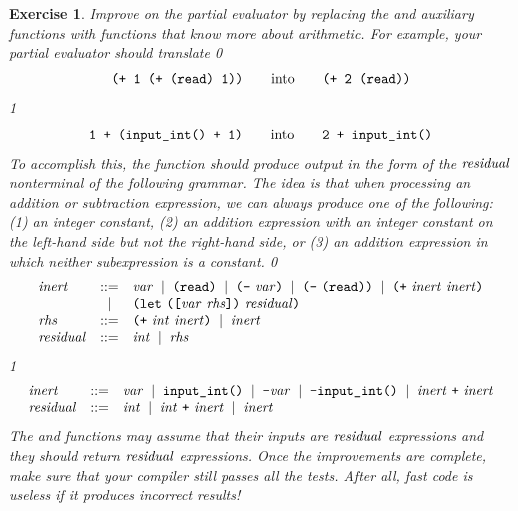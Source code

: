 \documentclass[7x10]{TimesAPriori_MIT}%
\def\racketEd{0}
\def\pythonEd{1}
\def\edition{1}
\newcommand{\pythonColor}[0]{}
\newtheorem{exercise}[theorem]{Exercise}
\numberwithin{theorem}{chapter}
\numberwithin{definition}{chapter}
\numberwithin{equation}{chapter}
\begin{document}
\begin{exercise}
\normalfont\normalsize

Improve on the partial evaluator by replacing the  and
 auxiliary functions with functions that know more about
arithmetic. For example, your partial evaluator should translate
{\if\edition\racketEd
\[
\texttt{(+ 1 (+ (read) 1))} \qquad \text{into} \qquad
\texttt{(+ 2 (read))}
\]
\fi}
{\if\edition\pythonEd\pythonColor
\[
\texttt{1 + (input\_int() + 1)} \qquad \text{into} \qquad
\texttt{2 + input\_int()}
\]
\fi}
%
To accomplish this, the  function should produce output
in the form of the $\mathit{residual}$ nonterminal of the following
grammar. The idea is that when processing an addition or subtraction
expression, we can always produce one of the following: (1) an integer
constant, (2) an addition expression with an integer constant on the
left-hand side but not the right-hand side, or (3) an addition
expression in which neither subexpression is a constant.
%
{\if\edition\racketEd
\[
\begin{array}{lcl}
  \mathit{inert} &::=& \mathit{var}
    \;\mid\; \texttt{(}\texttt{read}\texttt{)}
    \;\mid\; \texttt{(}\texttt{-} ~\mathit{var}\texttt{)}
    \;\mid\; \texttt{(}\texttt{-} ~\texttt{(}\texttt{read}\texttt{)}\texttt{)}
    \;\mid\; \texttt{(}\texttt{+} ~ \mathit{inert} ~ \mathit{inert}\texttt{)}\\
    &\;\mid\;& \texttt{(}\texttt{let}~\texttt{(}\texttt{[}\mathit{var}~\mathit{rhs}\texttt{]}\texttt{)}~ \mathit{residual} \texttt{)} \\  
  \mathit{rhs} &::=& \texttt{(}\texttt{+}~ \mathit{int}~ \mathit{inert}\texttt{)}
    \;\mid\; \mathit{inert} \\
  \mathit{residual} &::=& \mathit{int} \;\mid\; \mathit{rhs} 
\end{array}
\]
\fi}
{\if\edition\pythonEd\pythonColor
\[
\begin{array}{lcl}
  \mathit{inert} &::=& \mathit{var}
    \;\mid\; \texttt{input\_int}\texttt{(}\texttt{)}
    \;\mid\; \texttt{-} \mathit{var}
    \;\mid\; \texttt{-} \texttt{input\_int}\texttt{(}\texttt{)}
    \;\mid\; \mathit{inert} ~ \texttt{+} ~ \mathit{inert}\\
  \mathit{residual} &::=& \mathit{int}
    \;\mid\; \mathit{int} ~ \texttt{+} ~ \mathit{inert}
    \;\mid\; \mathit{inert} 
\end{array}
\]
\fi}
The  and  functions may assume that their
inputs are $\mathit{residual}$ expressions and they should return
$\mathit{residual}$ expressions.  Once the improvements are complete,
make sure that your compiler still passes all the tests.  After
all, fast code is useless if it produces incorrect results!
\end{exercise}
\end{document}
